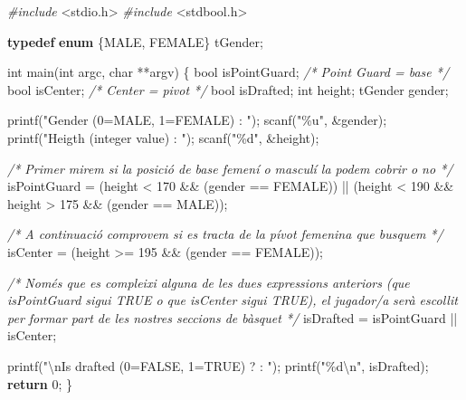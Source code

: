\documentclass[
]{book}
\newenvironment{Shaded}{\begin{snugshade}}{\end{snugshade}}
\newcommand{\CommentTok}[1]{\textcolor[rgb]{0.56,0.35,0.01}{\textit{#1}}}
\newcommand{\ControlFlowTok}[1]{\textcolor[rgb]{0.13,0.29,0.53}{\textbf{#1}}}
\newcommand{\DataTypeTok}[1]{\textcolor[rgb]{0.13,0.29,0.53}{#1}}
\newcommand{\DecValTok}[1]{\textcolor[rgb]{0.00,0.00,0.81}{#1}}
\newcommand{\ImportTok}[1]{#1}
\newcommand{\KeywordTok}[1]{\textcolor[rgb]{0.13,0.29,0.53}{\textbf{#1}}}
\newcommand{\NormalTok}[1]{#1}
\newcommand{\PreprocessorTok}[1]{\textcolor[rgb]{0.56,0.35,0.01}{\textit{#1}}}
\newcommand{\SpecialCharTok}[1]{\textcolor[rgb]{0.00,0.00,0.00}{#1}}
\newcommand{\StringTok}[1]{\textcolor[rgb]{0.31,0.60,0.02}{#1}}
\begin{document}
\begin{Shaded}
\begin{Highlighting}[]
\PreprocessorTok{\#include }\ImportTok{\textless{}stdio.h\textgreater{}}
\PreprocessorTok{\#include }\ImportTok{\textless{}stdbool.h\textgreater{}}

\KeywordTok{typedef} \KeywordTok{enum}\NormalTok{ \{MALE, FEMALE\} tGender;}

\DataTypeTok{int}\NormalTok{ main(}\DataTypeTok{int}\NormalTok{ argc, }\DataTypeTok{char}\NormalTok{ **argv) \{}
    \DataTypeTok{bool}\NormalTok{ isPointGuard; }\CommentTok{/* Point Guard = base */}
    \DataTypeTok{bool}\NormalTok{ isCenter;     }\CommentTok{/* Center = pivot */}
    \DataTypeTok{bool}\NormalTok{ isDrafted;}
    \DataTypeTok{int}\NormalTok{ height;}
\NormalTok{    tGender gender;}

\NormalTok{    printf(}\StringTok{"Gender (0=MALE, 1=FEMALE) : "}\NormalTok{);}
\NormalTok{    scanf(}\StringTok{"\%u"}\NormalTok{, \&gender);}
\NormalTok{    printf(}\StringTok{"Heigth (integer value) : "}\NormalTok{);}
\NormalTok{    scanf(}\StringTok{"\%d"}\NormalTok{, \&height);}

    \CommentTok{/* Primer mirem si la posició de base femení o masculí la podem cobrir o no */}
\NormalTok{    isPointGuard = }
\NormalTok{        (height \textless{} }\DecValTok{170}\NormalTok{ \&\& (gender == FEMALE)) ||}
\NormalTok{        (height \textless{} }\DecValTok{190}\NormalTok{ \&\& height \textgreater{} }\DecValTok{175}\NormalTok{ \&\& (gender == MALE));}

    \CommentTok{/* A continuació comprovem si es tracta de la pívot femenina que busquem */}
\NormalTok{    isCenter = (height \textgreater{}= }\DecValTok{195}\NormalTok{ \&\& (gender == FEMALE));}

    \CommentTok{/* Només que es compleixi alguna de les dues expressions anteriors }
\CommentTok{       (que isPointGuard sigui TRUE o que isCenter sigui TRUE), el jugador/a }
\CommentTok{       serà escollit per formar part de les nostres seccions de bàsquet */}
\NormalTok{    isDrafted = isPointGuard || isCenter;}

\NormalTok{    printf(}\StringTok{"}\SpecialCharTok{\textbackslash{}n}\StringTok{Is drafted (0=FALSE, 1=TRUE) ? : "}\NormalTok{);}
\NormalTok{    printf(}\StringTok{"\%d}\SpecialCharTok{\textbackslash{}n}\StringTok{"}\NormalTok{, isDrafted);}
    \ControlFlowTok{return} \DecValTok{0}\NormalTok{;}
\NormalTok{\}}
\end{Highlighting}
\end{Shaded}
\end{document}

